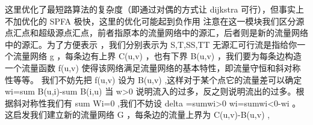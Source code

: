 {}这里优化了最短路算法的复杂度（即通过对偶的方式让\markdownRendererDollarSign{} dijkstra \markdownRendererDollarSign{}可行），但事实上不加优化的\markdownRendererDollarSign{} SPFA \markdownRendererDollarSign{}极快，这里的优化可能起到负作用\markdownRendererInterblockSeparator
{}\markdownRendererSectionBegin
{}\markdownRendererInterblockSeparator
{}\markdownRendererInterblockSeparator
{}
\markdownRendererSectionEnd \markdownRendererSectionBegin
{}\markdownRendererInterblockSeparator
{}\markdownRendererInterblockSeparator
{}
\markdownRendererSectionEnd 
\markdownRendererSectionEnd \markdownRendererSectionBegin
{}\markdownRendererInterblockSeparator
{}注意在这一模块我们区分源点汇点和超级源点汇点，前者指原本的流量网络中的源汇，后者则是新的流量网络中的源汇。为了方便表示 ，我们分别表示为\markdownRendererDollarSign{} S,T,SS,TT \markdownRendererDollarSign{}\markdownRendererInterblockSeparator
{}\markdownRendererSectionBegin
{}\markdownRendererInterblockSeparator
{}无源汇可行流是指给你一个流量网络\markdownRendererDollarSign{} g \markdownRendererDollarSign{}，每条边有上界\markdownRendererDollarSign{} C(u,v) \markdownRendererDollarSign{}，也有下界\markdownRendererDollarSign{} B(u,v) \markdownRendererDollarSign{}，我们要为每条边构造一个流量函数\markdownRendererDollarSign{} f(u,v) \markdownRendererDollarSign{}使得该网络满足流量网络的基本特性，即流量守恒和斜对称性等等。\markdownRendererParagraphSeparator
{}我们不妨先把\markdownRendererDollarSign{} f(u,v) \markdownRendererDollarSign{}设为\markdownRendererDollarSign{} B(u,v) \markdownRendererDollarSign{},这样对于某个点它的流量差可以确定\markdownRendererDollarSign{} w\markdownRendererUnderscore{}i=\markdownRendererBackslash{}sum B(u,i)-\markdownRendererBackslash{}sum B(i,u) \markdownRendererDollarSign{}\markdownRendererParagraphSeparator
{}当\markdownRendererDollarSign{} w>0 \markdownRendererDollarSign{}说明流入的过多，反之则说明流出的过多。根据斜对称性我们有\markdownRendererDollarSign{} \markdownRendererBackslash{}sum W\markdownRendererUnderscore{}i=0 \markdownRendererDollarSign{},我们不妨设\markdownRendererDollarSign{} \markdownRendererBackslash{}delta =\markdownRendererBackslash{}sum\markdownRendererUnderscore{}\markdownRendererLeftBrace{}wi>0\markdownRendererRightBrace{} wi=\markdownRendererBackslash{}sum\markdownRendererUnderscore{}\markdownRendererLeftBrace{}wi<0\markdownRendererRightBrace{}-wi \markdownRendererDollarSign{}。这启发我们建立新的流量网络\markdownRendererDollarSign{} G \markdownRendererDollarSign{}，每条边的流量上界为\markdownRendererDollarSign{} C(u,v)-B(u,v) \markdownRendererDollarSign{},\markdownRendererParagraphSeparator
